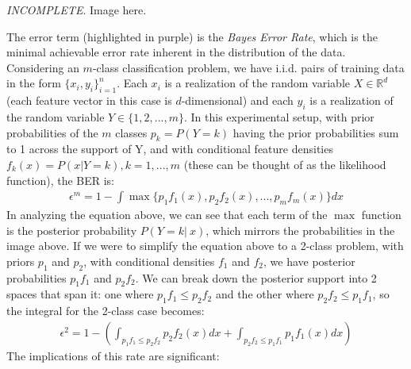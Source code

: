\documentclass[paper=a4, fontsize=12pt]{scrartcl} %
\numberwithin{equation}{section} %
\numberwithin{figure}{section} %
\numberwithin{table}{section} %
\begin{document}
\textit{INCOMPLETE}. Image here.

The error term (highlighted in purple) is the \textit{Bayes Error Rate}, which is the minimal achievable error 
rate inherent in the distribution of the data. Considering an $m$-class classification problem, we have i.i.d. 
pairs of training data in the form $\{x_i,y_i\}_{i =1}^n$. Each $x_i$ is a realization of the random variable 
$X \in \mathbb{R}^d$ (each feature vector in this case is $d$-dimensional) and each $y_i$ is a realization 
of the random variable $Y \in \{1,2,...,m\}$. In this experimental setup, with prior probabilities of the $m$ 
classes $p_k = P(Y = k)$ having the prior probabilities sum to 1 across the support of Y, and with conditional 
feature densities $f_k(x) = P(x|Y = k), k = 1,...,m$ (these can be thought of as the likelihood function), the BER is:
\begin{align*}
    \epsilon^m = 1 - \int \max\{ p_1 f_1(x), p_2 f_2(x), ..., p_m f_m(x)\}dx
\end{align*}
In analyzing the equation above, we can see that each term of the $\max$ function is the posterior probability 
$P(Y = k|\ x)$, which mirrors the probabilities in the image above. If we were to simplify the equation above 
to a 2-class problem, with priors $p_1$ and $p_2$, with conditional densities $f_1$ and $f_2$, we have posterior 
probabilities $p_1 f_1$ and $p_2 f_2$. We can break down the posterior support into 2 spaces that span it: one 
where $p_1 f_1 \leq p_2 f_2$ and the other where $p_2 f_2 \leq p_1 f_1$, so the integral for the 2-class case becomes:
\begin{align*}
    \epsilon^2 = 1 - \left( \int_{p_1f_1\leq p_2f_2} p_2 f_2(x) dx + \int_{p_2f_2\leq p_1f_1} p_1 f_1(x) dx \right)
\end{align*}
The implications of this rate are significant:
\end{document}
